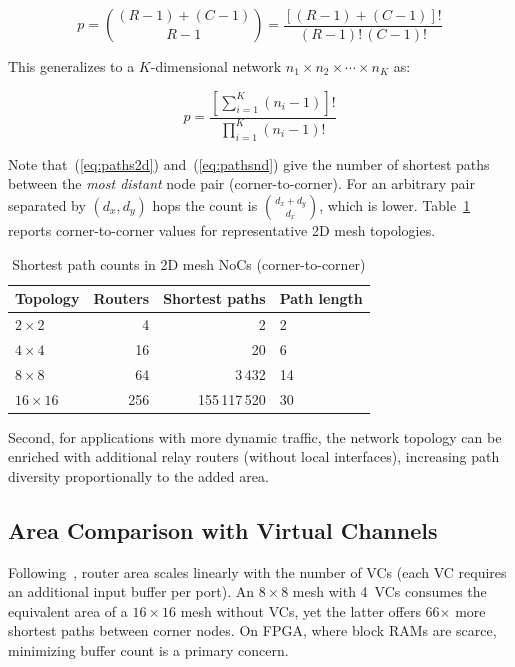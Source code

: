 \begin{equation}
  p = \binom{(R-1)+(C-1)}{R-1} = \frac{[(R-1)+(C-1)]!}{(R-1)!\,(C-1)!}
  \label{eq:paths2d}
\end{equation}

This generalizes to a $K$-dimensional network $n_1 \times n_2 \times \cdots \times
n_K$ as:

\begin{equation}
  p = \frac{\left[\sum_{i=1}^{K}(n_i-1)\right]!}{\prod_{i=1}^{K}(n_i-1)!}
  \label{eq:pathsnd}
\end{equation}

Note that~(\ref{eq:paths2d}) and~(\ref{eq:pathsnd}) give the number of shortest
paths between the \emph{most distant} node pair (corner-to-corner). For an
arbitrary pair separated by $(d_x, d_y)$ hops the count is $\binom{d_x+d_y}{d_x}$,
which is lower. Table~\ref{tab:paths} reports corner-to-corner values for
representative 2D mesh topologies.

\begin{table}[h]
\centering
\caption{Shortest path counts in 2D mesh NoCs (corner-to-corner)}
\label{tab:paths}
\begin{tabular}{@{}lrrl@{}}
\toprule
Topology & Routers & Shortest paths & Path length \\
\midrule
$2\times 2$   &   4 &               2 &  2 \\
$4\times 4$   &  16 &              20 &  6 \\
$8\times 8$   &  64 &           3\,432 & 14 \\
$16\times 16$ & 256 & 155\,117\,520    & 30 \\
\bottomrule
\end{tabular}
\end{table}

Second, for applications with more dynamic traffic, the network topology can be
enriched with additional relay routers (without local interfaces), increasing path
diversity proportionally to the added area.

\subsection{Area Comparison with Virtual Channels}

Following~\cite{mello2005}, router area scales linearly with the number of VCs
(each VC requires an additional input buffer per port). An $8\times 8$ mesh with
4~VCs consumes the equivalent area of a $16\times 16$ mesh without VCs, yet the
latter offers 66$\times$ more shortest paths between corner nodes. On FPGA, where
block RAMs are scarce, minimizing buffer count is a primary concern.


